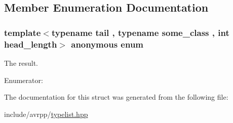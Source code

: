 \subsection{Member Enumeration Documentation}
\hypertarget{structavrpp_1_1typelist_1_1get__index_3_01typelist_3_01some__class_00_01tail_01_4_00_01some__class_00_01head__length_01_4_a3593d44543a3d901b2cf0c4f53791abd}{
\subsubsection[{"@31}]{\setlength{\rightskip}{0pt plus 5cm}template$<$typename tail , typename some\_\-class , int head\_\-length$>$ anonymous enum}}
\label{structavrpp_1_1typelist_1_1get__index_3_01typelist_3_01some__class_00_01tail_01_4_00_01some__class_00_01head__length_01_4_a3593d44543a3d901b2cf0c4f53791abd}


The result. 

\begin{Desc}
\item[Enumerator: ]\par
\begin{description}
\item[{\em 
\hypertarget{structavrpp_1_1typelist_1_1get__index_3_01typelist_3_01some__class_00_01tail_01_4_00_01some__class_00_01head__length_01_4_a3593d44543a3d901b2cf0c4f53791abdaa57f92febc323cd63afb88b8b027c387}{
result}
\label{structavrpp_1_1typelist_1_1get__index_3_01typelist_3_01some__class_00_01tail_01_4_00_01some__class_00_01head__length_01_4_a3593d44543a3d901b2cf0c4f53791abdaa57f92febc323cd63afb88b8b027c387}
}]\end{description}
\end{Desc}



The documentation for this struct was generated from the following file:\begin{DoxyCompactItemize}
\item 
include/avrpp/\hyperlink{typelist_8hpp}{typelist.hpp}\end{DoxyCompactItemize}
